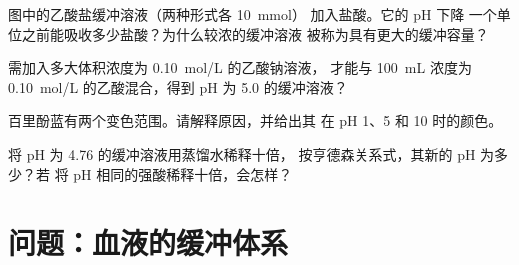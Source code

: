 \begin{exercise}[$\star\star\star$]\label{exo:g12:buffers-predominance:12}
图中的乙酸盐缓冲溶液（两种形式各 \qty{10}{mmol}）
加入盐酸。它的 pH 下降
一个单位之前能吸收多少盐酸？为什么较浓的缓冲溶液
被称为具有更大的缓冲容量？
\end{exercise}

\begin{exercise}[$\star\star\star$]\label{exo:g12:buffers-predominance:13}
需加入多大体积浓度为 \qty{0.10}{mol/L} 的乙酸钠溶液，
才能与 \qty{100}{mL} 浓度为 \qty{0.10}{mol/L} 的乙酸混合，得到
pH 为 5.0 的缓冲溶液？
\end{exercise}

\begin{exercise}[$\star\star\star$]\label{exo:g12:buffers-predominance:14}
百里酚蓝有两个变色范围。请解释原因，并给出其
在 pH 1、5 和 10 时的颜色。
\end{exercise}

\begin{exercise}[$\star\star\star$]\label{exo:g12:buffers-predominance:15}
将 pH 为 4.76 的缓冲溶液用蒸馏水稀释十倍，
按亨德森关系式，其新的 pH 为多少？若
将 pH 相同的强酸稀释十倍，会怎样？
\end{exercise}

\section{问题：血液的缓冲体系}

